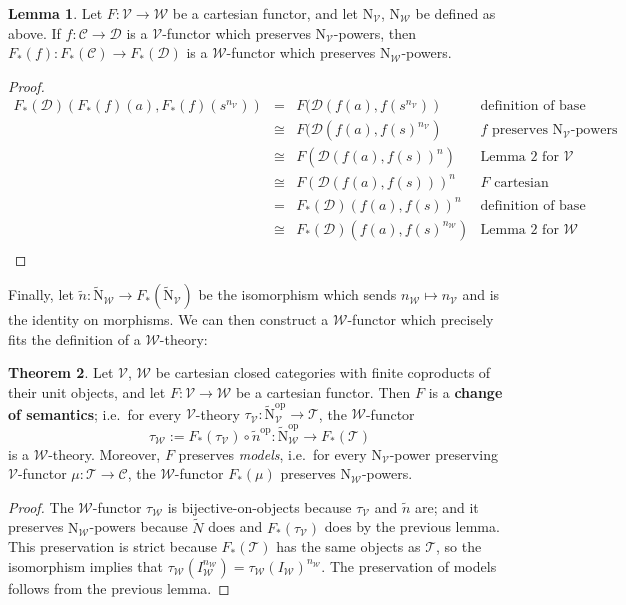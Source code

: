 \documentclass{amsart}
\theoremstyle{definition}
\newtheorem{theorem}{Theorem}
\newtheorem{lemma}[theorem]{Lemma}
\newcommand{\op}{\mathrm{op}}
\newcommand{\NN}{\mathrm{N}}
\newcommand{\V}{\mathscr{V}}
\newcommand{\W}{\mathscr{W}}
\newcommand{\D}{\mathscr{D}}
\newcommand{\C}{\mathscr{C}}
\newcommand{\T}{\mathscr{T}}
\newcommand{\maps}{\colon}
\begin{document}
\begin{lemma}
	Let $F\maps \V \to \W$ be a cartesian functor, and let $\NN_\V$, $\NN_\W$ be defined as above. If $f\maps \C \to \D$ is a $\V$-functor which preserves $\NN_\V$-powers, then $F_*(f)\maps F_*(\C)\to F_*(\D)$ is a $\W$-functor which preserves $\NN_\W$-powers.
\end{lemma}
\begin{proof}
	\[\begin{array}{rcll}
	F_*(\D)(F_*(f)(a),F_*(f)(s^{n_\V})) & = & F(\D(f(a),f(s^{n_\V})) & \text{definition of base change}\\
	& \cong & F(\D(f(a),f(s)^{n_\V}) & f \text{ preserves } \NN_\V \text{-powers}\\
	& \cong & F(\D(f(a),f(s))^n) & \text{Lemma 2 for } \V\\
	& \cong & F(\D(f(a),f(s)))^n & F \text{ cartesian}\\
	& = & F_*(\D)(f(a),f(s))^n & \text{definition of base change}\\
	& \cong & F_*(\D)(f(a),f(s)^{n_\W}) & \text{Lemma 2 for } \W\\
	\end{array}\]
\end{proof}

Finally, let $\tilde{n}\maps \tilde{\NN}_\W \to F_*(\tilde{\NN}_\V)$ be the isomorphism which sends $n_\W \mapsto n_\V$ and is the identity on morphisms. We can then construct a $\W$-functor which precisely fits the definition of a $\W$-theory:

\begin{theorem}
	Let $\V$, $\W$ be cartesian closed categories with finite coproducts of their unit objects, and let $F\maps \V \to \W$ be a cartesian functor. Then $F$ is a \textbf{change of semantics}; i.e.\ for every $\V$-theory $\tau_\V\maps \tilde{\NN}_\V^\op \to \T$, the $\W$-functor $$\tau_\W := F_*(\tau_\V) \circ \tilde{n}^\op\maps \tilde{\NN}_\W^\op \to F_*(\T)$$ is a $\W$-theory. Moreover, $F$ preserves \textit{models}, i.e.\ for every $\NN_\V$-power preserving $\V$-functor $\mu\maps\T \to \C$, the $\W$-functor $F_*(\mu)$ preserves $\NN_\W$-powers.
\end{theorem}
\begin{proof}
	The $\W$-functor $\tau_\W$ is bijective-on-objects because $\tau_\V$ and $\tilde{n}$ are; and it preserves $\NN_\W$-powers because $\tilde{N}$ does and $F_*(\tau_\V)$ does by the previous lemma. This preservation is strict because $F_*(\T)$ has the same objects as $\T$, so the isomorphism implies that $\tau_\W(I_\W^{n_\W}) = \tau_\W(I_\W)^{n_\W}$. The preservation of models follows from the previous lemma.
\end{proof}
\end{document}

